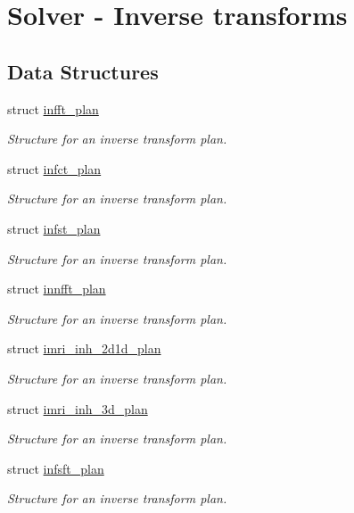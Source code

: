 \hypertarget{group__solver}{
\section{Solver - Inverse transforms}
\label{group__solver}
}
\subsection*{Data Structures}
\begin{CompactItemize}
\item 
struct \hyperlink{structinfft__plan}{infft\_\-plan}
\begin{CompactList}\small\item\em Structure for an inverse transform plan. \item\end{CompactList}\item 
struct \hyperlink{structinfct__plan}{infct\_\-plan}
\begin{CompactList}\small\item\em Structure for an inverse transform plan. \item\end{CompactList}\item 
struct \hyperlink{structinfst__plan}{infst\_\-plan}
\begin{CompactList}\small\item\em Structure for an inverse transform plan. \item\end{CompactList}\item 
struct \hyperlink{structinnfft__plan}{innfft\_\-plan}
\begin{CompactList}\small\item\em Structure for an inverse transform plan. \item\end{CompactList}\item 
struct \hyperlink{structimri__inh__2d1d__plan}{imri\_\-inh\_\-2d1d\_\-plan}
\begin{CompactList}\small\item\em Structure for an inverse transform plan. \item\end{CompactList}\item 
struct \hyperlink{structimri__inh__3d__plan}{imri\_\-inh\_\-3d\_\-plan}
\begin{CompactList}\small\item\em Structure for an inverse transform plan. \item\end{CompactList}\item 
struct \hyperlink{structinfsft__plan}{infsft\_\-plan}
\begin{CompactList}\small\item\em Structure for an inverse transform plan. \item\end{CompactList}\end{CompactItemize}
